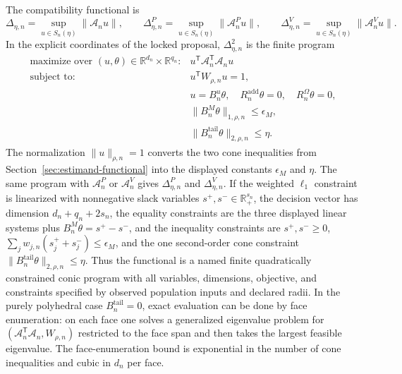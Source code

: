 \documentclass[11pt]{article}
\newcommand{\transpose}{\mathsf{T}}
\newcommand{\R}{\mathbb{R}}
\theoremstyle{definition}
\theoremstyle{plain}
\theoremstyle{remark}
\begin{document}
The compatibility functional is
\[
  \Delta_{\eta,n}
  =
  \sup_{u\in S_n(\eta)} \|\mathcal A_nu\|,
  \qquad
  \Delta^P_{\eta,n}
  =
  \sup_{u\in S_n(\eta)} \|\mathcal A^P_nu\|,
  \qquad
  \Delta^V_{\eta,n}
  =
  \sup_{u\in S_n(\eta)} \|\mathcal A^V_nu\|.
\]
In the explicit coordinates of the locked proposal, \(\Delta_{\eta,n}^2\) is
the finite program
\[
\begin{array}{ll}
\text{maximize over }(u,\theta)\in\R^{d_n}\times\R^{q_n}:&
   u^{\transpose}\mathcal A_n^{\transpose}\mathcal A_nu\\[1mm]
\text{subject to:}&
   u^{\transpose}W_{\rho,n}u=1,\\
&  u=B^u_n\theta,\quad
   R^{\mathrm{add}}_n\theta=0,\quad R^\Omega_n\theta=0,\\
&  \|B^M_n\theta\|_{1,\rho,n}\le \epsilon_M,\\
&  \|B^{\mathrm{tail}}_n\theta\|_{2,\rho,n}\le \eta .
\end{array}
\]
The normalization \(\|u\|_{\rho,n}=1\) converts the two cone inequalities from
Section~\ref{sec:estimand-functional} into the displayed constants
\(\epsilon_M\) and \(\eta\).  The same program with \(\mathcal A^P_n\) or
\(\mathcal A^V_n\) gives \(\Delta^P_{\eta,n}\) and
\(\Delta^V_{\eta,n}\).  If the weighted \(\ell_1\) constraint is linearized
with nonnegative slack variables \(s^+,s^-\in\R^{s_n}_+\), the decision vector
has dimension \(d_n+q_n+2s_n\), the equality constraints are the three
displayed linear systems plus \(B^M_n\theta=s^+-s^-\), and the inequality
constraints are \(s^+,s^-\ge0\),
\(\sum_j w_{j,n}(s^+_j+s^-_j)\le\epsilon_M\), and the one second-order cone
constraint \(\|B^{\mathrm{tail}}_n\theta\|_{2,\rho,n}\le\eta\).  Thus the
functional is a named finite quadratically constrained conic program with all
variables, dimensions, objective, and constraints specified by observed
population inputs and declared radii.  In the purely polyhedral case
\(B^{\mathrm{tail}}_n=0\), exact evaluation can be done by face enumeration:
on each face one solves a generalized eigenvalue problem for
\((\mathcal A_n^{\transpose}\mathcal A_n,W_{\rho,n})\) restricted to the face
span and then takes the largest feasible eigenvalue.  The face-enumeration
bound is exponential in the number of cone inequalities and cubic in \(d_n\)
per face.
\end{document}
